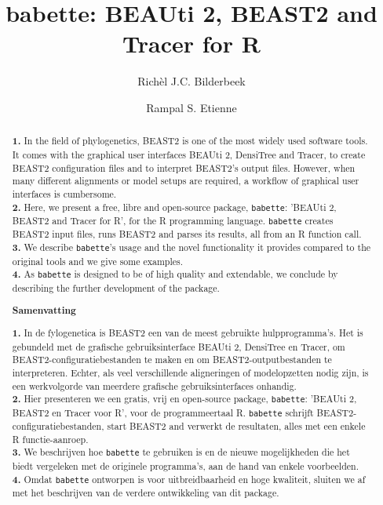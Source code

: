 \documentclass{article}
\title{babette: BEAUti 2, BEAST2 and Tracer for R}
\author[1]{Rich\`el J.C. Bilderbeek}
\author[1]{Rampal S. Etienne}
\affil[1]{Groningen Institute for Evolutionary Life Sciences, University of Groningen, Groningen, The Netherlands}
\begin{document}
\maketitle

\begin{abstract}

  \textbf{1. }
    In the field of phylogenetics, 
    BEAST2 is one of the most widely used software tools. 
    It comes with the graphical user interfaces BEAUti 2, DensiTree and Tracer,
    to create BEAST2 configuration files and to interpret BEAST2's output files. 
    However, when many different alignments or model 
    setups are required, a workflow of graphical user interfaces is cumbersome. \\
  \textbf{2. }
    Here, we present a free, libre and open-source package, \verb;babette;: 
    'BEAUti 2, BEAST2 and Tracer for R', for the R programming language. 
    \verb;babette; creates BEAST2 input files, runs BEAST2 and parses its results, 
    all from an R function call. \\
  \textbf{3. }
    We describe \verb;babette;'s usage and the novel functionality it provides
    compared to the original tools and we give some examples. \\
  \textbf{4. }
    As \verb;babette; is designed to be of high quality and extendable, 
    we conclude by describing the further development of the package. \\

  \begin{center}
  \textbf{Samenvatting}
  \end{center}
  \textbf{1. }
    In de fylogenetica is BEAST2 een van de meest gebruikte hulpprogramma's. 
    Het is gebundeld met de grafische gebruiksinterface BEAUti 2, DensiTree en Tracer, 
    om BEAST2-configuratiebestanden te maken en om BEAST2-outputbestanden te interpreteren. 
    Echter, als veel verschillende aligneringen of modelopzetten nodig zijn, 
    is een werkvolgorde van meerdere grafische gebruiksinterfaces onhandig. \\
  \textbf{2. }
    Hier presenteren we een gratis, vrij en open-source package, \verb;babette;: 
    'BEAUti 2, BEAST2 en Tracer voor R', voor de programmeertaal R. 
    \verb;babette; schrijft BEAST2-configuratiebestanden, start BEAST2 and verwerkt de resultaten, 
    alles met een enkele R functie-aanroep. \\
  \textbf{3. }
    We beschrijven hoe \verb;babette; te gebruiken is 
    en de nieuwe mogelijkheden die het biedt vergeleken met de originele programma's, 
    aan de hand van enkele voorbeelden. \\
  \textbf{4. }
    Omdat \verb;babette; ontworpen is voor uitbreidbaarheid en hoge kwaliteit, 
    sluiten we af met het beschrijven van de verdere ontwikkeling van dit package. \\
\end{abstract}
\end{document}
